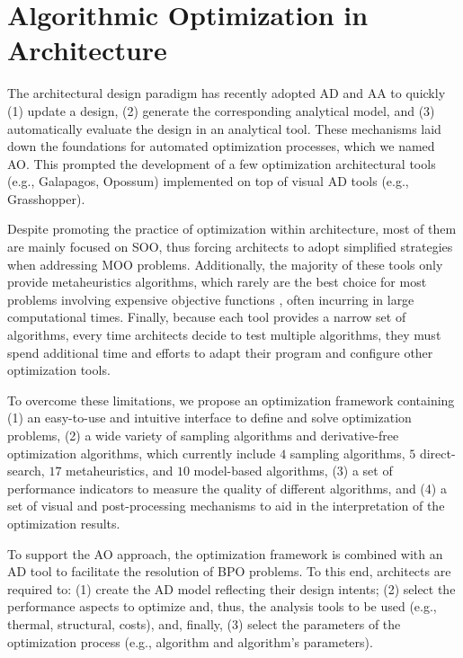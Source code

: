 \section{Algorithmic Optimization in Architecture} %
\label{sec: Methodology}
The architectural design paradigm has recently adopted \ac{AD} and \ac{AA} to quickly (1) update a design, (2) generate the corresponding analytical model, and (3) automatically evaluate the design in an analytical tool. These mechanisms laid down the foundations for automated optimization processes, which we named \ac{AO}. This prompted the development of a few optimization architectural tools (e.g., Galapagos, Opossum) implemented on top of visual \ac{AD} tools (e.g., Grasshopper). 

Despite promoting the practice of optimization within architecture, most of them are mainly focused on \ac{SOO}, thus forcing architects to adopt simplified strategies when addressing \ac{MOO} problems. Additionally, the majority of these tools only provide metaheuristics algorithms, which rarely are the best choice for most problems involving expensive objective functions \cite{Wortmann2017GABESTCHOICE}, often incurring in large computational times. Finally, because each tool provides a narrow set of algorithms, every time architects decide to test multiple algorithms, they must spend additional time and efforts to adapt their program and configure other optimization tools.

To overcome these limitations, we propose an optimization framework containing (1) an easy-to-use and intuitive interface to define and solve optimization problems, (2) a wide variety of sampling algorithms and derivative-free optimization algorithms, which currently include $4$ sampling algorithms, $5$ direct-search, $17$ metaheuristics, and $10$ model-based algorithms, (3) a set of performance indicators to measure the quality of different algorithms, and (4) a set of visual and post-processing mechanisms to aid in the interpretation of the optimization results. 

To support the \ac{AO} approach, the optimization framework is combined with an \ac{AD} tool to facilitate the resolution of \ac{BPO} problems. To this end, architects are required to: (1) create the \ac{AD} model reflecting their design intents; (2) select the performance aspects to optimize and, thus, the analysis tools to be used (e.g., thermal, structural, costs), and, finally, (3) select the parameters of the optimization process (e.g., algorithm and algorithm's parameters).

